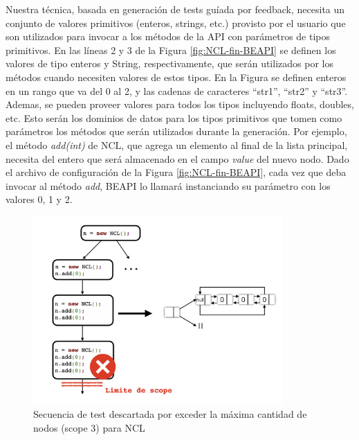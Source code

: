 Nuestra técnica, basada en generación de tests guíada por feedback, necesita un
conjunto de valores primitivos (enteros, strings, etc.) provisto por el usuario
que son utilizados para invocar a los métodos de la API con parámetros de
tipos primitivos. En las líneas 2 y 3 de la Figura \ref{fig:NCL-fin-BEAPI} se
definen los valores de tipo enteros y String, respectivamente, que serán utilizados por los métodos 
cuando necesiten valores de estos tipos. En la Figura se definen enteros en un
rango que va del 0 al 2, y las cadenas de caracteres ``str1'', ``str2'' y 
``str3''. Ademas, se pueden proveer valores para todos los tipos incluyendo floats, doubles, etc. 
Esto serán los dominios de datos para los tipos primitivos que tomen como
parámetros los métodos que serán utilizados durante la generación.
Por ejemplo, el método \emph{add(int)} de NCL, que agrega un elemento al final de la lista
principal, necesita del entero que será almacenado en el campo \emph{value} del nuevo nodo. 
Dado el archivo de configuración de la Figura \ref{fig:NCL-fin-BEAPI}, cada vez
que deba invocar al método \emph{add}, BEAPI lo llamará instanciando su parámetro con los valores 0,
1 y 2.

\begin{figure}[H]
    \centering
    \includegraphics[width=0.85\textwidth]{images/scope.jpg}
    \caption{Secuencia de test descartada por exceder la máxima cantidad de
    nodos (scope 3) para NCL}
    \label{fig:scope}
\end{figure}



